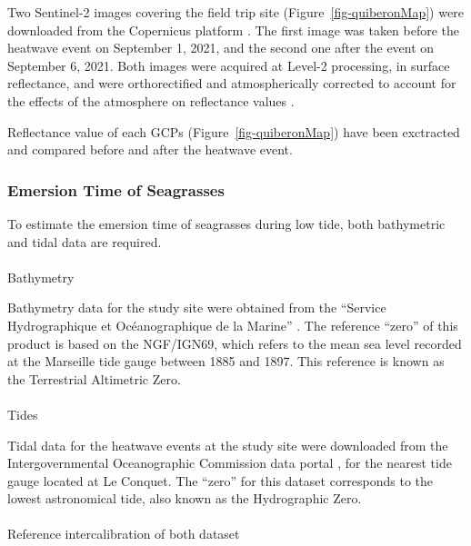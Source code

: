 \documentclass[
  number]{elsarticle}
\makeatletter
\let\oldparagraph\paragraph
\renewcommand{\paragraph}{
    \@ifstar
      \xxxParagraphStar
      \xxxParagraphNoStar
  }
\newcommand{\xxxParagraphStar}[1]{\oldparagraph*{#1}\mbox{}}
\newcommand{\xxxParagraphNoStar}[1]{\oldparagraph{#1}\mbox{}}
\makeatother
\begin{document}
Two Sentinel-2 images covering the field trip site
(Figure~\ref{fig-quiberonMap}) were downloaded from the Copernicus
platform \citep{copernicus_sentinel2}. The first image was taken before
the heatwave event on September 1, 2021, and the second one after the
event on September 6, 2021. Both images were acquired at Level-2
processing, in surface reflectance, and were orthorectified and
atmospherically corrected to account for the effects of the atmosphere
on reflectance values \citep{sen2cor}.

Reflectance value of each GCPs (Figure~\ref{fig-quiberonMap}) have been
exctracted and compared before and after the heatwave event.

\subsubsection{Emersion Time of
Seagrasses}\label{emersion-time-of-seagrasses}

To estimate the emersion time of seagrasses during low tide, both
bathymetric and tidal data are required.

\paragraph{Bathymetry}\label{bathymetry}

Bathymetry data for the study site were obtained from the ``Service
Hydrographique et Océanographique de la Marine''
\citep{shom_bathymetry_litto3d_bzh_2018_2021}. The reference ``zero'' of
this product is based on the NGF/IGN69, which refers to the mean sea
level recorded at the Marseille tide gauge between 1885 and 1897. This
reference is known as the Terrestrial Altimetric Zero.

\paragraph{Tides}\label{tides}

Tidal data for the heatwave events at the study site were downloaded
from the Intergovernmental Oceanographic Commission data portal
\citep{ioc_sea_level_lecy}, for the nearest tide gauge located at Le
Conquet. The ``zero'' for this dataset corresponds to the lowest
astronomical tide, also known as the Hydrographic Zero.

\paragraph{Reference intercalibration of both
dataset}\label{reference-intercalibration-of-both-dataset}
\end{document}
